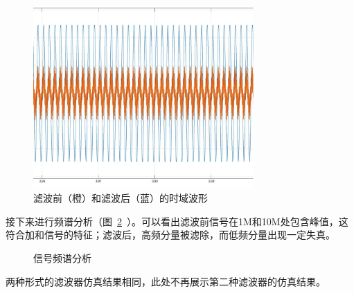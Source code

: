 \begin{figure}[htbp]
  \centering
  \includegraphics[width = 0.75\textwidth]{figure/exp4/scope.pdf}
  \caption{滤波前（橙）和滤波后（蓝）的时域波形}
  \label{fig:exp4:scope}  
\end{figure}

接下来进行频谱分析（图~\ref{fig:exp4:spectrum}~）。可以看出滤波前信号在1M和10M处包含峰值，这符合加和信号的特征；滤波后，高频分量被滤除，而低频分量出现一定失真。

\begin{figure}[htbp]
  \centering
  \hfill
  \caption{信号频谱分析}
  \label{fig:exp4:spectrum}
\end{figure}

\begin{remark}
两种形式的滤波器仿真结果相同，此处不再展示第二种滤波器的仿真结果。
\end{remark}

